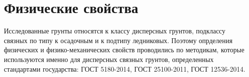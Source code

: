 %
%
%
%
%
%
%
%
%
%
%
%

\section{Физические свойства}\label{sec:ch6/sec3}

Исследованные грунты относятся к классу дисперсных грунтов, подклассу связных по типу 
к осадочным и к подтипу ледниковых. 
Поэтому опрделения физических и физико-механических свойств проводились по методикам, 
которые используются именно для дисперсных связных грунтов, определенных 
стандартами государства: ГОСТ 5180-2014, ГОСТ 25100-2011, ГОСТ 12536-2014.

